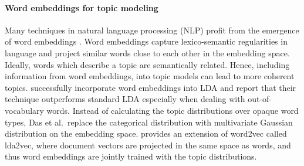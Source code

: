 \paragraph{Word embeddings for topic modeling} Many techniques in natural language processing (NLP) profit from the emergence of word embeddings \citep{mikolovdistributed2013,bengioneural2003}. Word embeddings capture lexico-semantic regularities in language and project similar words close to each other in the embedding space. Ideally, words which describe a topic are semantically related. Hence, including information from word embeddings, into topic models can lead to more coherent topics. \citet{dasgaussian2015} successfully incorporate word embeddings into LDA and report that their technique outperforms standard LDA especially when dealing with out-of-vocabulary words. Instead of calculating the topic distributions over opaque word types, Das et al.~replace the categorical distribution with multivariate Gaussian distribution on the embedding space. \citet{Moody16} provides an extension of word2vec called lda2vec, where document vectors are projected in the same space as words, and thus word embeddings are jointly trained with the topic distributions.


